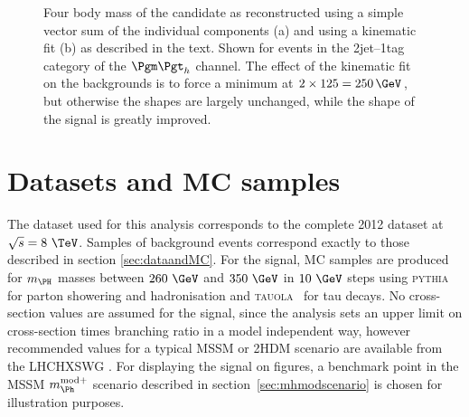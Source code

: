 \begin{figure}
\begin{center}

\end{center}
\caption[Four body mass of the candidate \PH in data and MC events reconstructed
with and without a kinematic fit.]{
Four body mass of the candidate \PH as reconstructed using a simple vector sum of the
individual components (a) and using a kinematic fit (b) as
described in the text. Shown for events in the 2jet--1tag category of the
$\mutau$ channel. The effect of the kinematic fit on the backgrounds is to force
a minimum at $2\times125=250\,\GeV$, but otherwise the shapes are largely
unchanged, while the shape of the signal is greatly improved.}
\label{fig:kinfitvsmttbbstacked}
\end{figure} 

\section{Datasets and MC samples}
\label{sec:Hhhdatasets}

The dataset used for this analysis corresponds to the complete 2012 dataset at
$\sqrt{s}=8~\TeV$. Samples of background events correspond exactly to those
described in section \ref{sec:dataandMC}. For the signal, \ac{MC} samples are
produced for $m_{\PH}$ masses between $260~\GeV$ and $350~\GeV$ in $10~\GeV$
steps using \textsc{pythia}
for parton showering and hadronisation and \textsc{tauola}~\cite{TAUOLA} for tau
decays. No cross-section values are assumed for the signal, since the analysis
sets an upper limit on cross-section times branching ratio in a model
independent way, however recommended
values for a typical \ac{MSSM} or 2HDM scenario are available from the \ac{LHCHXSWG}
\cite{LHCHiggsCrossSectionWorkingGroup:2011ti,Dittmaier:2012vm,Heinemeyer:2013tqa}.
For displaying the signal on figures, a benchmark point in the \ac{MSSM}
$m_{\Ph}^{\text{mod+}}$ scenario described in section~\ref{sec:mhmodscenario} is
chosen for illustration purposes.

